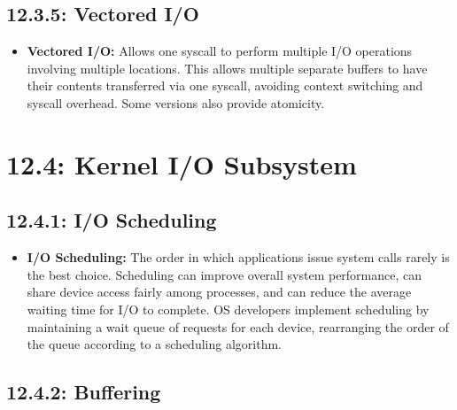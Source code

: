 \documentclass[12pt]{article}
\begin{document}
\subsection*{12.3.5: Vectored I/O}

\begin{itemize}
    \item \textbf{Vectored I/O:} Allows one syscall to perform multiple I/O operations involving multiple locations. This allows multiple separate buffers to have their contents transferred via one syscall, avoiding context switching and syscall overhead. Some versions also provide atomicity.
\end{itemize}

\section*{12.4: Kernel I/O Subsystem}

\subsection*{12.4.1: I/O Scheduling}

\begin{itemize}
    \item \textbf{I/O Scheduling:} The order in which applications issue system calls rarely is the best choice. Scheduling can improve overall system performance, can share device access fairly among processes, and can reduce the average waiting time for I/O to complete. OS developers implement scheduling by maintaining a wait queue of requests for each device, rearranging the order of the queue according to a scheduling algorithm.
\end{itemize}

\subsection*{12.4.2: Buffering}
\end{document}
